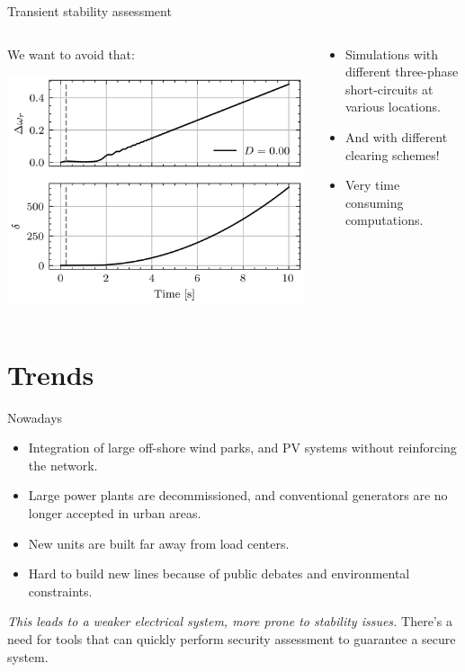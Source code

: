 \begin{frame}{Transient stability assessment}
    \begin{columns}
    \begin{column}{0.6\textwidth}
        We want to avoid that:
        \begin{center}
        \includegraphics[width=0.9\linewidth]{images/P-dynamics_failed.png}
        \end{center}
    \end{column}
    \begin{column}{0.4\textwidth}
    \begin{itemize}
        \item Simulations with different three-phase short-circuits at various locations.
        \item And with different clearing schemes!
        \item Very time consuming computations.
    \end{itemize}
    \end{column}
\end{columns}
\end{frame}

\section{Trends}
\begin{frame} {Nowadays}
\begin{itemize}
    \item Integration of large off-shore wind parks, and PV systems without reinforcing the network.
    \item Large power plants are decommissioned, and conventional generators are no longer accepted in urban areas.
    \item New units are built far away from load centers.
    \item Hard to build new lines because of public debates and environmental constraints.
\end{itemize}
\emph{This leads to a weaker electrical system, more prone to stability issues.}
There's a need for tools that can quickly perform security assessment to guarantee a secure system.
\end{frame}

